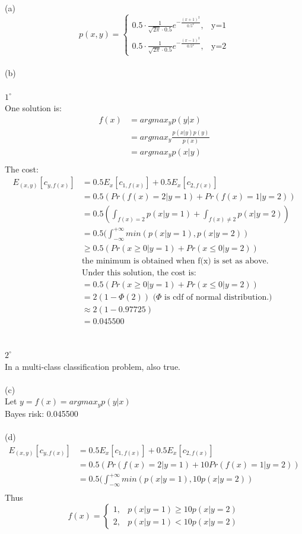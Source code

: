 \documentclass[12pt,letterpaper,fleqn]{hmcpset}
\begin{document}
\begin{problem}
\end{problem}
\begin{solution}
(a)
\\
$$p(x,y)=
\begin{cases}
0.5\cdot\frac{1}{\sqrt{2\pi}\cdot 0.5}e^{-\frac{(x+1)^2}{0.5^2}},& \text{y=1}\\
0.5\cdot\frac{1}{\sqrt{2\pi}\cdot 0.5}e^{-\frac{(x-1)^2}{0.5^2}},& \text{y=2}
\end{cases}$$
\\(b)
\\\\ $1^\circ$
\\One solution is:
\begin{align*}
f(x) &= argmax_yp(y|x)\\
&=argmax_y\frac{p(x|y)p(y)}{p(x)}\\
&=argmax_yp(x|y)\\
\end{align*}
The cost:
\begin{align*}
E_{(x,y)}[c_{y,f(x)}]&=0.5E_x[c_{1,f(x)}]+0.5E_x[c_{2,f(x)}]\\
&=0.5(Pr(f(x)=2|y=1)+Pr(f(x)=1|y=2))\\
&=0.5(\int_{f(x)=2}p(x|y=1)+\int_{f(x)\ne 2}p(x|y=2))\\
&=0.5(\int_{-\infty}^{+\infty} min(p(x|y=1),p(x|y=2))\\
&\ge 0.5(Pr(x\ge 0|y=1)+Pr(x\le 0|y=2))\\
&\text{the minimum is obtained when f(x) is set as above.}\\
&\text{Under this solution, the cost is: }\\
&=0.5(Pr(x\ge 0|y=1)+Pr(x\le 0|y=2))\\
&=2(1-\Phi(2)) \text{ ($\Phi$ is cdf of normal distribution.) }\\
&\approx 2(1-0.97725)\\
&=0.045500
\end{align*}
\\\\ $2^\circ$
\\In a multi-class classification problem, also true.
\\\\(c) 
\\Let $y = f(x) = argmax_yp(y|x)$
\\Bayes risk: 0.045500
\\\\(d)
\begin{align*}
E_{(x,y)}[c_{y,f(x)}]&=0.5E_x[c_{1,f(x)}]+0.5E_x[c_{2,f(x)}]\\
&=0.5(Pr(f(x)=2|y=1)+10Pr(f(x)=1|y=2))\\
&=0.5(\int_{-\infty}^{+\infty} min(p(x|y=1),10p(x|y=2))\\
\end{align*}
\indent \indent Thus$$f(x)=
\begin{cases}
1,&p(x|y=1)\ge 10p(x|y=2)\\
2,&p(x|y=1)<10p(x|y=2)
\end{cases}$$
\end{solution}
\end{document}
